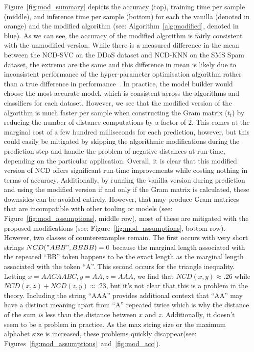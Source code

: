 \documentclass[conference]{IEEEtran}
\begin{document}
Figure~\ref{fig:mod_summary} depicts the accuracy (top), training time per sample (middle), and inference time per sample (bottom) for each the vanilla (denoted in orange) and the modified algorithm (see: Algorithm~\ref{alg:modified}, denoted in blue). As we can see, the accuracy of the modified algorithm is fairly consistent with the unmodified version. While there is a measured difference in the mean between the NCD-SVC on the DDoS dataset and NCD-KNN on the SMS Spam dataset, the extrema are the same and this difference in mean is likely due to inconsistent performance of the hyper-parameter optimisation algorithm rather than a true difference in performance~\cite{tpe}. In practice, the model builder would choose the most accurate model, which is consistent across the algorithms and classifiers for each dataset. However, we see that the modified version of the algorithm is much faster per sample when constructing the Gram matrix ($t_t$) by reducing the number of distance computations by a factor of 2. This comes at the marginal cost of a few hundred milliseconds for each prediction, however, but this could easily be mitigated by skipping the algorithmic modifications during the prediction step and handle the problem of negative distances at run-time, depending on the particular application. Overall, it is clear that this modified version of NCD offers significant run-time improvements while costing nothing in terms of accuracy. 
Additionally, by running the vanilla version during prediction and using the modified version if and only if the Gram matrix is calculated, these downsides can be avoided entirely. 
However, that may produce Gram matrices that are incompatible with other tooling or models (see: Figure~\ref{fig:mod_assumptions}, middle row), most of these are mitigated with the proposed modifications (see: Figure~\ref{fig:mod_assumptions}, bottom row). 
However, two classes of counterexamples remain. 
The first occurs with very short strings
$NCD("ABB", BBBB) =0$ because the marginal length associated with the repeated ``BB'' token happens to be the exact length as the marginal length associated with the token ``A''. 
This second occurs for the triangle inequality. 
Letting $x =AACAABC, y = AA,
z=AAA$, we find that $NCD(x,y) \approx .26$ while $NCD(x,z) + NCD(z,y) \approx .23$, but it's not clear that this is a problem in the theory. Including the string ``AAA'' provides additional context that ``AA'' may have a distinct meaning apart from ``A'' repeated twice which is why the distance of the sum \textit{is} less than the distance between $x$ and $z$. Additionally, it doesn't seem to be a problem in practice. As the max string size or the maximum alphabet size is increased, these problems quickly disappear(see: Figures~\ref{fig:mod_assumptions}~and~\ref{fig:mod_acc}).
\end{document}
